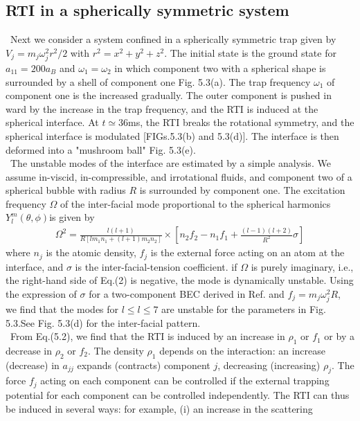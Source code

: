 \documentclass[12pt,a4paper]{report} %
\begin{document}
\subsection{RTI in a spherically symmetric system}
\ Next we consider a system confined in a spherically symmetric
trap given by $V_j = m_j \omega^2_j r^2 / 2 $ with $r^2 = x^2+y^2+z^2$.
The initial state is the ground state for $a_{11}=200 a_B$ and
$\omega_1 = \omega_2$ in which component two with a spherical shape is
surrounded by a shell of component one Fig. 5.3(a). The trap
frequency $\omega_1$ of component one is the increased gradually.
The outer component is pushed in ward by the increase in the
trap frequency, and the RTI is induced at the spherical interface.
At $t \simeq 36$ms, the RTI breaks the rotational symmetry, and
the spherical interface is modulated [FIGs.5.3(b) and 5.3(d)].
The interface is then deformed into a "mushroom ball" Fig. 5.3(e).
\\
\ The unstable modes of the interface are estimated by a
simple analysis. We assume in-viscid, in-compressible, and
irrotational fluids, and component two of a spherical bubble
with radius $R$ is surrounded by component one. The excitation
frequency $\Omega$ of the inter-facial mode proportional to the
spherical harmonics $Y_l^m (\theta, \phi)$is given by \cite{73}
\begin{eqnarray}
\Omega^2 = \frac{l(l+1)}{R[lm_1 n_1 + (l+1)m_2 n_2]}
\times \left[ 
n_2 f_2 - n_1 f_1 + \frac{(l-1)(l+2)}{R^2}\sigma
\right]
\end{eqnarray}
where $n_j$ is the atomic density, $f_j$ is the external force acting
on an atom at the interface, and $\sigma$ is the inter-facial-tension
coefficient. if $\Omega$ is purely imaginary, i.e., the right-hand side of
Eq.(2) is negative, the mode is dynamically unstable. Using the
expression of $\sigma$ for a two-component BEC derived in Ref.\cite{74}
and $f_j = m_j \omega_j^2 R$, we find that the modes for $l \leq l \leq 7$ are
unstable for the parameters in Fig. 5.3.See Fig. 5.3(d) for the inter-facial pattern.
\\
\ From Eq.(5.2), we find that the RTI is induced by an
increase in $\rho_1$ or $f_1$ or by a decrease in $\rho_2$ or $f_2$. The density
$\rho_1$ depends on the interaction: an increase (decrease) in $a_{jj}$
expands (contracts) component $j$, decreasing (increasing) $\rho_{j}$.
The force $f_j$ acting on each component can be controlled if
the external trapping potential for each component can be
controlled independently. The RTI can thus be induced in
several ways: for example, (i) an increase in the scattering
\end{document}
